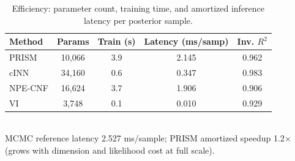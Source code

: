 \begin{table}[t]
\centering
\caption{Efficiency: parameter count, training time, and amortized inference latency per posterior sample.}
\label{tab:efficiency}
\begin{tabular}{lcccc}
\toprule
Method & Params & Train (s) & Latency (ms/samp) & Inv. $R^2$ \\
\midrule
PRISM & 10,066 & 3.9 & 2.145 & 0.962 \\
cINN & 34,160 & 0.6 & 0.347 & 0.983 \\
NPE-CNF & 16,624 & 3.7 & 1.906 & 0.906 \\
VI & 3,748 & 0.1 & 0.010 & 0.929 \\
\bottomrule
\end{tabular}
\\[2pt]\footnotesize MCMC reference latency 2.527 ms/sample; PRISM amortized speedup 1.2$\times$ (grows with dimension and likelihood cost at full scale).
\end{table}
